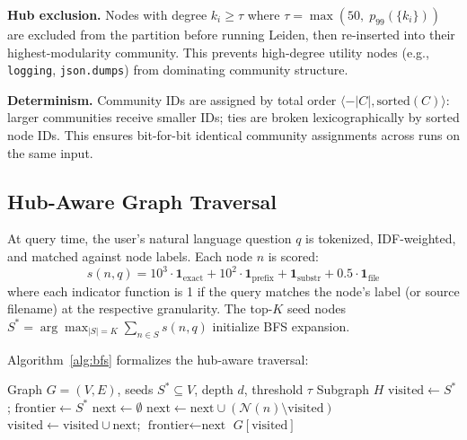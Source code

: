 \medskip
\noindent\textbf{Hub exclusion.}
Nodes with degree $k_i \geq \tau$ where $\tau = \max(50,\; p_{99}(\{k_i\}))$
are excluded from the partition before running Leiden, then re-inserted into
their highest-modularity community. This prevents high-degree utility nodes
(e.g., \texttt{logging}, \texttt{json.dumps}) from dominating community
structure.

\medskip
\noindent\textbf{Determinism.}
Community IDs are assigned by total order $\langle -|C|, \text{sorted}(C)
\rangle$: larger communities receive smaller IDs; ties are broken
lexicographically by sorted node IDs. This ensures bit-for-bit identical
community assignments across runs on the same input.

\subsection{Hub-Aware Graph Traversal}
\label{subsec:traversal}

At query time, the user's natural language question $q$ is tokenized,
IDF-weighted, and matched against node labels. Each node $n$ is scored:
\begin{equation}
  s(n, q) = 10^3 \cdot \mathbf{1}_\text{exact} + 10^2 \cdot
  \mathbf{1}_\text{prefix} + \mathbf{1}_\text{substr} + 0.5 \cdot
  \mathbf{1}_\text{file}
  \label{eq:score}
\end{equation}
where each indicator function is 1 if the query matches the node's label (or
source filename) at the respective granularity. The top-$K$ seed nodes
$S^* = \arg\!\max_{|S|=K} \sum_{n \in S} s(n, q)$ initialize BFS expansion.

Algorithm~\ref{alg:bfs} formalizes the hub-aware traversal:

\begin{algorithm}[h]
\caption{Hub-Aware BFS}
\label{alg:bfs}
\begin{algorithmic}[1]
\REQUIRE Graph $G=(V,E)$, seeds $S^* \subseteq V$, depth $d$, threshold $\tau$
\ENSURE Subgraph $H$
\STATE $\text{visited} \gets S^*$;\; $\text{frontier} \gets S^*$
  \STATE $\text{next} \gets \emptyset$
      \STATE $\text{next} \gets \text{next} \cup (\mathcal{N}(n) \setminus \text{visited})$
    \ENDIF
  \ENDFOR
  \STATE $\text{visited} \gets \text{visited} \cup \text{next}$;\; $\text{frontier} \gets \text{next}$
\ENDFOR
\RETURN $G[\text{visited}]$
\end{algorithmic}
\end{algorithm}

